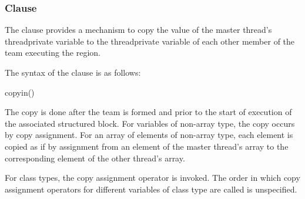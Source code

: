 \subsubsection{ Clause}
\label{subsubsec:copyin clause}
\summary
The  clause provides a mechanism to copy the value of the master thread's
threadprivate variable to the threadprivate variable of each other member of the team
executing the  region.

\syntax
The syntax of the  clause is as follows:

\begin{ompSyntax}
copyin()
\end{ompSyntax}

\descr
\begin{ccppspecific}
The copy is done after the team is formed and prior to the start of execution of the
associated structured block. For variables of non-array type, the copy occurs by copy
assignment. For an array of elements of non-array type, each element is copied as if by
assignment from an element of the master thread's array to the corresponding element of
the other thread's array.
\end{ccppspecific}

\begin{cppspecific}
For class types, the copy assignment operator is invoked. The order in which copy
assignment operators for different variables of class type are called is unspecified.
\end{cppspecific}

